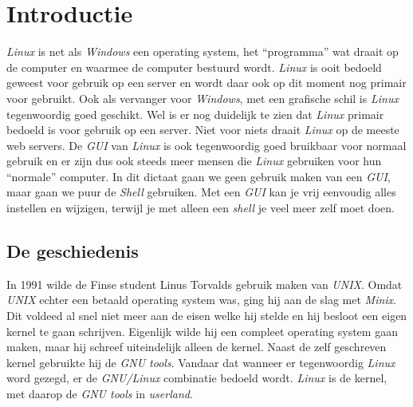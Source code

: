 %
%
%
%

\chapter{Introductie}
\emph{Linux} is net als \emph{Windows} een operating system, het ``programma'' wat draait op de computer en waarmee de computer bestuurd wordt. \emph{Linux} is ooit bedoeld geweest voor gebruik op een server en wordt daar ook op dit moment nog primair voor gebruikt. Ook als vervanger voor \emph{Windows}, met een grafische schil is \emph{Linux} tegenwoordig goed geschikt. Wel is er nog duidelijk te zien dat \emph{Linux} primair bedoeld is voor gebruik op  een server. Niet voor niets draait \emph{Linux} op de meeste web servers. De \emph{GUI} van \emph{Linux} is ook tegenwoordig goed bruikbaar voor normaal gebruik en er zijn dus ook steeds meer mensen die \emph{Linux} gebruiken voor hun ``normale'' computer. In dit dictaat gaan we geen gebruik maken van een \emph{GUI}, maar gaan we  puur de \emph{Shell} gebruiken. Met een \emph{GUI} kan je vrij eenvoudig alles instellen en wijzigen, terwijl je met alleen een \emph{shell} je veel meer zelf moet doen.

\section{De geschiedenis}
In 1991 wilde de Finse student Linus Torvalds gebruik maken van \emph{UNIX}. Omdat \emph{UNIX} echter een betaald operating system was, ging hij aan de slag met \emph{Minix}. Dit voldeed al snel niet meer aan de eisen welke hij stelde en hij besloot een eigen kernel te gaan schrijven. Eigenlijk wilde hij een compleet operating system gaan maken, maar hij schreef uiteindelijk alleen de kernel. Naast de zelf geschreven kernel gebruikte hij de \emph{GNU tools}. Vandaar dat wanneer er tegenwoordig \emph{Linux} word gezegd, er de \emph{GNU/Linux} combinatie bedoeld wordt. \emph{Linux} is de kernel, met daarop de \emph{GNU tools} in \emph{userland}.

